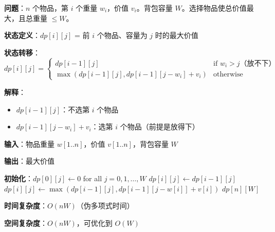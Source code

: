 \documentclass[12pt, a4paper]{ctexart}
\begin{document}
\begin{blackboard}[0-1 背包问题]

\textbf{问题}：$n$ 个物品，第 $i$ 个重量 $w_i$，价值 $v_i$。背包容量 $W$。选择物品使总价值最大，且总重量 $\leq W$。

\textbf{状态定义}：$dp[i][j]$ = 前 $i$ 个物品、容量为 $j$ 时的最大价值

\textbf{状态转移}：
\[
dp[i][j] = \begin{cases}
dp[i-1][j] & \text{if } w_i > j \text{（放不下）} \\
\max(dp[i-1][j], dp[i-1][j-w_i] + v_i) & \text{otherwise}
\end{cases}
\]

\textbf{解释}：
\begin{itemize}
    \item $dp[i-1][j]$：不选第 $i$ 个物品
    \item $dp[i-1][j-w_i] + v_i$：选第 $i$ 个物品（前提是放得下）
\end{itemize}

\end{blackboard}

\begin{blackboard}[0-1 背包的完整算法]

\textbf{输入}：物品重量 $w[1..n]$，价值 $v[1..n]$，背包容量 $W$

\textbf{输出}：最大价值

\begin{algorithmic}[1]
\STATE \textbf{初始化}：$dp[0][j] \gets 0$ for all $j = 0, 1, \ldots, W$
            \STATE $dp[i][j] \gets dp[i-1][j]$ 
        \ELSE
            \STATE $dp[i][j] \gets \max(dp[i-1][j], dp[i-1][j-w[i]] + v[i])$
        \ENDIF
    \ENDFOR
\ENDFOR
\RETURN $dp[n][W]$
\end{algorithmic}

\textbf{时间复杂度}：$O(nW)$（伪多项式时间）

\textbf{空间复杂度}：$O(nW)$，可优化到 $O(W)$

\end{blackboard}
\end{document}
